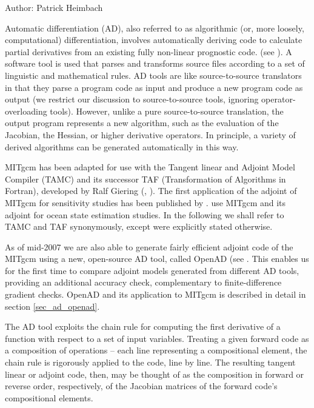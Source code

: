
Author: Patrick Heimbach

{\sf Automatic differentiation} (AD), also referred to as algorithmic
(or, more loosely, computational) differentiation, involves
automatically deriving code to calculate partial derivatives from an
existing fully non-linear prognostic code.  (see \cite{gri:00}).  A
software tool is used that parses and transforms source files
according to a set of linguistic and mathematical rules.  AD tools are
like source-to-source translators in that they parse a program code as
input and produce a new program code as output
(we restrict our discussion to source-to-source tools, ignoring
operator-overloading tools).  However, unlike a
pure source-to-source translation, the output program represents a new
algorithm, such as the evaluation of the Jacobian, the Hessian, or
higher derivative operators.  In principle, a variety of derived
algorithms can be generated automatically in this way.

MITgcm has been adapted for use with the Tangent linear and Adjoint
Model Compiler (TAMC) and its successor TAF (Transformation of
Algorithms in Fortran), developed by Ralf Giering (\cite{gie-kam:98},
\cite{gie:99,gie:00}).  The first application of the adjoint of MITgcm
for sensitivity studies has been published by \cite{maro-eta:99}.
\cite{stam-etal:97,stam-etal:02} use MITgcm and its adjoint for ocean
state estimation studies.  In the following we shall refer to TAMC and
TAF synonymously, except were explicitly stated otherwise.

As of mid-2007 we are also able to generate fairly efficient
adjoint code of the MITgcm using a new, open-source AD tool,
called OpenAD (see \cite{naum-etal:06,utke-etal:08}.
This enables us for the first time to compare adjoint models
generated from different AD tools, providing an additional
accuracy check, complementary to finite-difference gradient checks.
OpenAD and its application to  MITgcm is described in detail
in section \ref{sec_ad_openad}.

The AD tool exploits the chain rule for computing the first derivative of a
function with respect to a set of input variables.  Treating a given
forward code as a composition of operations -- each line representing
a compositional element, the chain rule is rigorously applied to the
code, line by line. The resulting tangent linear or adjoint code,
then, may be thought of as the composition in forward or reverse
order, respectively, of the Jacobian matrices of the forward code's
compositional elements.

